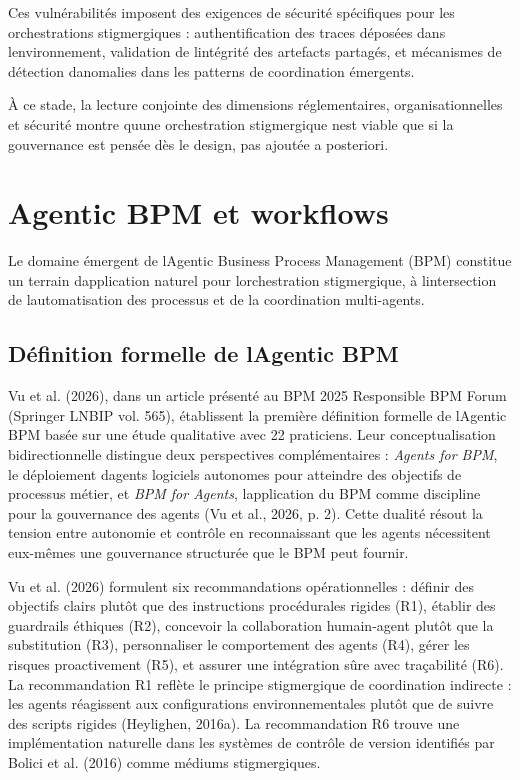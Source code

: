 \documentclass[12pt,a4paper]{article}
\begin{document}
Ces vulnérabilités imposent des exigences de sécurité spécifiques pour
les orchestrations stigmergiques : authentification des traces déposées
dans l\textquotesingle environnement, validation de
l\textquotesingle intégrité des artefacts partagés, et mécanismes de
détection d\textquotesingle anomalies dans les patterns de coordination
émergents.

À ce stade, la lecture conjointe des dimensions réglementaires,
organisationnelles et sécurité montre qu\textquotesingle une
orchestration stigmergique n\textquotesingle est viable que si la
gouvernance est pensée dès le design, pas ajoutée a posteriori.

\section{Agentic BPM et workflows}\label{agentic-bpm-et-workflows}

Le domaine émergent de l\textquotesingle Agentic Business Process
Management (BPM) constitue un terrain d\textquotesingle application
naturel pour l\textquotesingle orchestration stigmergique, à
l\textquotesingle intersection de l\textquotesingle automatisation des
processus et de la coordination multi-agents.

\subsection{Définition formelle de l\textquotesingle Agentic
BPM}\label{duxe9finition-formelle-de-lagentic-bpm}

Vu et al. (2026), dans un article présenté au BPM 2025 Responsible BPM
Forum (Springer LNBIP vol. 565), établissent la première définition
formelle de l\textquotesingle Agentic BPM basée sur une étude
qualitative avec 22 praticiens. Leur conceptualisation bidirectionnelle
distingue deux perspectives complémentaires : \emph{Agents for BPM}, le
déploiement d\textquotesingle agents logiciels autonomes pour atteindre
des objectifs de processus métier, et \emph{BPM for Agents},
l\textquotesingle application du BPM comme discipline pour la
gouvernance des agents (Vu et al., 2026, p. 2). Cette dualité résout la
tension entre autonomie et contrôle en reconnaissant que les agents
nécessitent eux-mêmes une gouvernance structurée que le BPM peut
fournir.

Vu et al. (2026) formulent six recommandations opérationnelles : définir
des objectifs clairs plutôt que des instructions procédurales rigides
(R1), établir des guardrails éthiques (R2), concevoir la collaboration
humain-agent plutôt que la substitution (R3), personnaliser le
comportement des agents (R4), gérer les risques proactivement (R5), et
assurer une intégration sûre avec traçabilité (R6). La recommandation R1
reflète le principe stigmergique de coordination indirecte : les agents
réagissent aux configurations environnementales plutôt que de suivre des
scripts rigides (Heylighen, 2016a). La recommandation R6 trouve une
implémentation naturelle dans les systèmes de contrôle de version
identifiés par Bolici et al. (2016) comme médiums stigmergiques.
\end{document}
